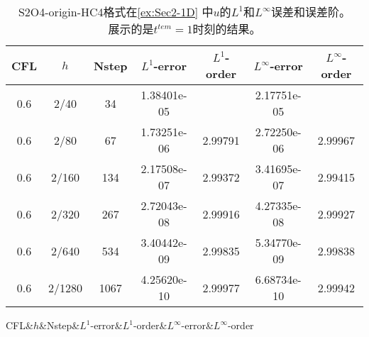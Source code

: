 \def\titleintable{CFL&$h$&Nstep&$L^1$-error&$L^1$-order&$L^\infty$-error&$L^\infty$-order\\}
\begin{table}[htbp]
  \caption{S2O4-origin-HC4格式在\cref{ex:Sec2-1D} 中$u$的$L^1$和$L^\infty$误差和误差阶。\\展示的是$t^{tem} = 1$时刻的结果。}
  \label{ta:ex2_1}
  \centering
  \begin{tabular}{ccccccc}
    \toprule
    \titleintable
    \midrule
    0.6 & 2/40   & 34   & 1.38401e-05 &         & 2.17751e-05 &         \\
    0.6 & 2/80   & 67   & 1.73251e-06 & 2.99791 & 2.72250e-06 & 2.99967 \\
    0.6 & 2/160  & 134  & 2.17508e-07 & 2.99372 & 3.41695e-07 & 2.99415 \\
    0.6 & 2/320  & 267  & 2.72043e-08 & 2.99916 & 4.27335e-08 & 2.99927 \\
    0.6 & 2/640  & 534  & 3.40442e-09 & 2.99835 & 5.34770e-09 & 2.99838 \\
    0.6 & 2/1280 & 1067 & 4.25620e-10 & 2.99977 & 6.68734e-10 & 2.99942 \\
    \bottomrule
  \end{tabular}
\end{table}
\undef\titleintable
